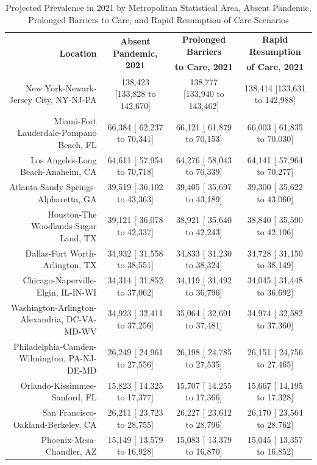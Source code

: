 \documentclass{article}
\begin{document}
\begin{table}[H]
	\caption{Projected Prevalence in 2021 by Metropolitan Statistical Area, Absent Pandemic, Prolonged Barriers to Care, and Rapid Resumption of Care Scenarios}
	\footnotesize
	\begin{tabular}{|r|c|c|c|}
		\hline
		\multirow{2}{*}{\textbf{Location}} & \multirow{2}{*}{\textbf{Absent Pandemic, 2021}} & \textbf{Prolonged Barriers} & \textbf{Rapid Resumption}\\
		&  & \textbf{to Care, 2021} & \textbf{of Care, 2021}\\
		\hline\hline
		New York-Newark-Jersey City, NY-NJ-PA & 138,423 [133,828 to 142,670] & 138,777 [133,940 to 143,462] & 138,414 [133,631 to 142,988]\\
		Miami-Fort Lauderdale-Pompano Beach, FL &  66,384 [ 62,237 to  70,341] &  66,121 [ 61,879 to  70,153] &  66,003 [ 61,835 to  70,030]\\
		Los Angeles-Long Beach-Anaheim, CA &  64,611 [ 57,954 to  70,718] &  64,276 [ 58,043 to  70,339] &  64,141 [ 57,964 to  70,277]\\
		Atlanta-Sandy Springs-Alpharetta, GA &  39,519 [ 36,102 to  43,363] &  39,405 [ 35,697 to  43,189] &  39,300 [ 35,622 to  43,060]\\
		Houston-The Woodlands-Sugar Land, TX &  39,121 [ 36,078 to  42,337] &  38,921 [ 35,640 to  42,243] &  38,840 [ 35,590 to  42,106]\\
		Dallas-Fort Worth-Arlington, TX &  34,932 [ 31,558 to  38,551] &  34,833 [ 31,230 to  38,324] &  34,728 [ 31,150 to  38,149]\\
		Chicago-Naperville-Elgin, IL-IN-WI &  34,314 [ 31,852 to  37,062] &  34,119 [ 31,492 to  36,796] &  34,045 [ 31,448 to  36,692]\\
		Washington-Arlington-Alexandria, DC-VA-MD-WV &  34,923 [ 32,411 to  37,256] &  35,064 [ 32,691 to  37,481] &  34,974 [ 32,582 to  37,360]\\
		Philadelphia-Camden-Wilmington, PA-NJ-DE-MD &  26,249 [ 24,961 to  27,556] &  26,198 [ 24,785 to  27,535] &  26,151 [ 24,756 to  27,465]\\
		Orlando-Kissimmee-Sanford, FL &  15,823 [ 14,325 to  17,377] &  15,707 [ 14,255 to  17,366] &  15,667 [ 14,195 to  17,328]\\
		San Francisco-Oakland-Berkeley, CA &  26,211 [ 23,723 to  28,755] &  26,227 [ 23,612 to  28,796] &  26,170 [ 23,564 to  28,762]\\
		Phoenix-Mesa-Chandler, AZ &  15,149 [ 13,579 to  16,928] &  15,083 [ 13,379 to  16,870] &  15,045 [ 13,357 to  16,852]\\

\end{tabular}
\end{table}
\end{document}
